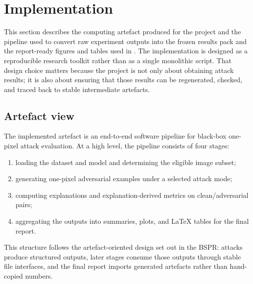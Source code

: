 \section{Implementation}
\label{sec:implementation}

This section describes the computing artefact produced for the project and the pipeline used to
convert raw experiment outputs into the frozen results pack and the report-ready figures and
tables used in . The implementation is designed as a reproducible research
toolkit rather than as a single monolithic script. That design choice matters because the
project is not only about obtaining attack results; it is also about ensuring that those results
can be regenerated, checked, and traced back to stable intermediate artefacts.

\subsection{Artefact view}
The implemented artefact is an end-to-end software pipeline for black-box one-pixel attack
evaluation. At a high level, the pipeline consists of four stages:
\begin{enumerate}
  \item loading the dataset and model and determining the eligible image subset;
  \item generating one-pixel adversarial examples under a selected attack mode;
  \item computing explanations and explanation-derived metrics on clean/adversarial pairs;
  \item aggregating the outputs into summaries, plots, and \LaTeX{} tables for the final report.
\end{enumerate}
This structure follows the artefact-oriented design set out in the BSPR: attacks produce
structured outputs, later stages consume those outputs through stable file interfaces, and the
final report imports generated artefacts rather than hand-copied numbers.


